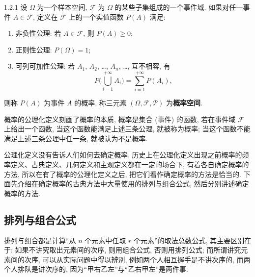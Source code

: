 \begin{definition}{}{1.2.1}
  设 $\Omega$ 为一个样本空间,
  $\mathscr{F}$ 为 $\Omega$ 的某些子集组成的一个事件域.
  如果对任一事件 $A \in \mathscr{F}$,
  定义在 $\mathscr{F}$ 上的一个实值函数 $P(A)$ 满足:
  \begin{enumerate}
    \item 非负性公理:
    若 $A \in \mathscr{F}$,
    则 $P(A) \ge 0$;
    \item 正则性公理:
    $P (\Omega) = 1$;
    \item 可列可加性公理:
    若 $A_1$, $A_2$, \dots, $A_n$, \dots, 互不相容,
    有
    \begin{equation}
      P \biggl( \bigcup _{i=1} ^{+\infty} A_i \biggr) = \sum _{i=1} ^{+\infty} P ( A _i ),\label{eq1.2.1}
    \end{equation}
  \end{enumerate}
  则称 $P (A)$ 为事件 $A$ 的概率,
  称三元素 $(\Omega, \mathscr{F}, \mathscr{P})$ 为\textbf{概率空间}.
\end{definition}

概率的公理化定义刻画了概率的本质,
概率是集合 (事件) 的函数,
若在事件域 $\mathscr{F}$ 上给出一个函数,
当这个函数能满足上述三条公理,
就被称为概率;
当这个函数不能满足上述三条公理中任一条,
就被认为不是概率.

公理化定义没有告诉人们如何去确定概率.
历史上在公理化定义出现之前概率的频率定义、古典定义、几何定义和主观定义都在一定的场合下,
有着各自确定概率的方法,
所以在有了概率的公理化定义之后,
把它们看作确定概率的方法是恰当的.
下面先介绍在确定概率的古典方法中大量使用的排列与组合公式,
然后分别讲述确定概率的方法.

\subsection{排列与组合公式}

排列与组合都是计算“从 $n$ 个元素中任取 $r$ 个元素”的取法总数公式,
其主要区别在于:
如果不讲究取出元素间的次序,
则用组合公式,
否则用排列公式;
而所谓讲究元素间的次序,
可以从实际问题中得以辨别,
例如两个人相互握手是不讲次序的,
而两个人排队是讲次序的,
因为“甲右乙左”与“乙右甲左”是两件事.

